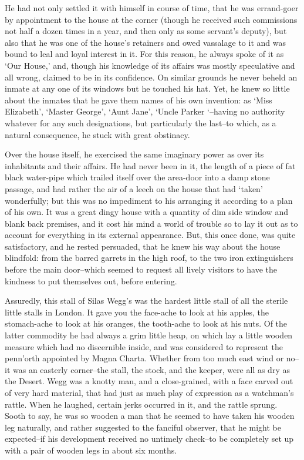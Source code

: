 He had not only settled it with himself in course of time, that he
was errand-goer by appointment to the house at the corner (though he
received such commissions not half a dozen times in a year, and then
only as some servant’s deputy), but also that he was one of the house’s
retainers and owed vassalage to it and was bound to leal and loyal
interest in it. For this reason, he always spoke of it as ‘Our House,’
and, though his knowledge of its affairs was mostly speculative and
all wrong, claimed to be in its confidence. On similar grounds he never
beheld an inmate at any one of its windows but he touched his hat. Yet,
he knew so little about the inmates that he gave them names of his own
invention: as ‘Miss Elizabeth’, ‘Master George’, ‘Aunt Jane’, ‘Uncle
Parker ‘--having no authority whatever for any such designations, but
particularly the last--to which, as a natural consequence, he stuck with
great obstinacy.

Over the house itself, he exercised the same imaginary power as over its
inhabitants and their affairs. He had never been in it, the length of
a piece of fat black water-pipe which trailed itself over the area-door
into a damp stone passage, and had rather the air of a leech on the
house that had ‘taken’ wonderfully; but this was no impediment to his
arranging it according to a plan of his own. It was a great dingy house
with a quantity of dim side window and blank back premises, and it
cost his mind a world of trouble so to lay it out as to account for
everything in its external appearance. But, this once done, was quite
satisfactory, and he rested persuaded, that he knew his way about the
house blindfold: from the barred garrets in the high roof, to the two
iron extinguishers before the main door--which seemed to request all
lively visitors to have the kindness to put themselves out, before
entering.

Assuredly, this stall of Silas Wegg’s was the hardest little stall of
all the sterile little stalls in London. It gave you the face-ache
to look at his apples, the stomach-ache to look at his oranges, the
tooth-ache to look at his nuts. Of the latter commodity he had always
a grim little heap, on which lay a little wooden measure which had
no discernible inside, and was considered to represent the penn’orth
appointed by Magna Charta. Whether from too much east wind or no--it was
an easterly corner--the stall, the stock, and the keeper, were all as
dry as the Desert. Wegg was a knotty man, and a close-grained, with a
face carved out of very hard material, that had just as much play
of expression as a watchman’s rattle. When he laughed, certain jerks
occurred in it, and the rattle sprung. Sooth to say, he was so wooden
a man that he seemed to have taken his wooden leg naturally, and rather
suggested to the fanciful observer, that he might be expected--if his
development received no untimely check--to be completely set up with a
pair of wooden legs in about six months.

